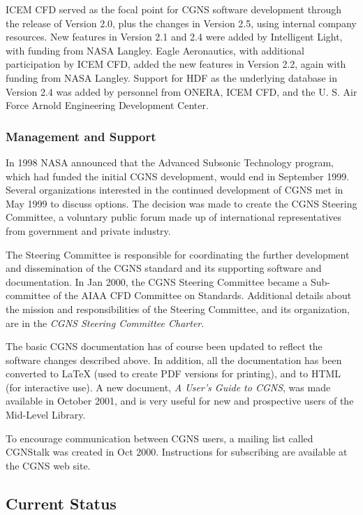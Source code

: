 ICEM CFD served as the focal point for CGNS software development through
the release of Version 2.0, plus the changes in Version 2.5, using
internal company resources.
New features in Version 2.1 and 2.4 were added by Intelligent Light,
with funding from NASA Langley.
Eagle Aeronautics, with additional participation by ICEM CFD, added the
new features in Version 2.2, again with funding from NASA Langley.
Support for HDF as the underlying database in Version 2.4 was added
by personnel from ONERA, ICEM CFD, and the U. S. Air Force Arnold
Engineering Development Center.

\subsubsection{Management and Support}

In 1998 NASA announced that the Advanced Subsonic Technology program,
which had funded the initial CGNS development, would end in September
1999.
Several organizations interested in the continued development of CGNS
met in May 1999 to discuss options.
The decision was made to create the CGNS Steering Committee, a voluntary
public forum made up of international representatives from government
and private industry.

The Steering Committee is responsible for coordinating the further
development and dissemination of the CGNS standard and its supporting
software and documentation.
In Jan 2000, the CGNS Steering Committee became a Sub-committee of the
AIAA CFD Committee on Standards.
Additional details about the mission and responsibilities of the
Steering Committee, and its organization, are in the \textit{CGNS Steering
Committee Charter}.

The basic CGNS documentation has of course been updated to reflect the
software changes described above.
In addition, all the documentation has been converted to LaTeX (used
to create PDF versions for printing), and to HTML (for interactive
use).
A new document, \textit{A User's Guide to CGNS}, was made available in
October 2001, and is very useful for new and prospective users of the
Mid-Level Library.

To encourage communication between CGNS users, a mailing list called
CGNStalk was created in Oct 2000.
Instructions for subscribing are available at the CGNS web site.

\subsection{Current Status}

